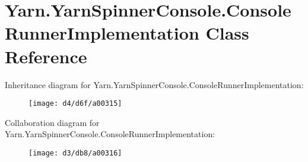 \hypertarget{a00030}{\section{Yarn.\-Yarn\-Spinner\-Console.\-Console\-Runner\-Implementation Class Reference}
\label{a00030}
}


Inheritance diagram for Yarn.\-Yarn\-Spinner\-Console.\-Console\-Runner\-Implementation\-:
\nopagebreak
\begin{figure}[H]
\begin{center}
\leavevmode
\texttt{[image: d4/d6f/a00315]}
\end{center}
\end{figure}


Collaboration diagram for Yarn.\-Yarn\-Spinner\-Console.\-Console\-Runner\-Implementation\-:
\nopagebreak
\begin{figure}[H]
\begin{center}
\leavevmode
\texttt{[image: d3/db8/a00316]}
\end{center}
\end{figure}
